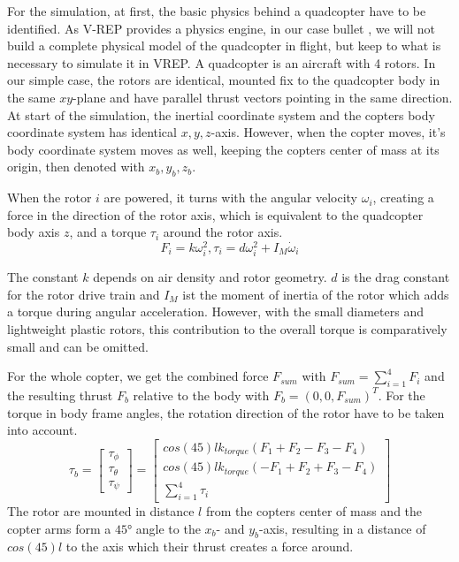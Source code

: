     
    For the simulation, at first, the basic physics behind a quadcopter have to be identified. 
    As V-REP provides a physics engine, in our case bullet \cite{bullet}, we will not build a complete physical model of the quadcopter in flight, but keep to what is necessary to simulate it in VREP.
    A quadcopter is an aircraft with 4 rotors. 
    In our simple case, the rotors are identical, mounted fix to the quadcopter body in the same $xy$-plane and have parallel thrust vectors pointing in the same direction. 
    At start of the simulation, the inertial coordinate system and the copters body coordinate system has identical $x,y,z$-axis. 
    However, when the copter moves, it's body coordinate system moves as well, keeping the copters center of mass at its origin, then denoted with $x_b, y_b, z_b$.
    
    When the rotor $i$ are powered, it turns with the angular velocity $\omega_i$, creating a force in the direction of the rotor axis, which is equivalent to the quadcopter body axis $z$, and a torque $\tau_i$ around the rotor axis.
    \begin{equation}
    F_i = k\omega_i^2, \tau_i = d\omega_i^2 + I_M\dot\omega_i
    \label{equ:forceAndTorque}
    \end{equation}
    
    The constant $k$ depends on air density and rotor geometry. $d$ is the drag constant for the rotor drive train and $I_M$ ist the moment of inertia of the rotor which adds a torque during angular acceleration. However, with the small diameters and lightweight plastic rotors, this contribution to the overall torque is comparatively small and can be omitted.
    
    For the whole copter, we get the combined force $F_{sum}$ with $F_{sum} = \sum_{i=1}^{4}{F_i}$ and the resulting thrust $F_b$ relative to the body with $F_b = (0, 0, F_{sum})^T$. For the torque in body frame angles, the rotation direction of the rotor have to be taken into account.
    \begin{equation}
    \tau_b =\begin{bmatrix}\tau_\phi \\ \tau_\theta \\ \tau_\psi \end{bmatrix} = \begin{bmatrix}cos(45)lk_{torque}(F_1 + F_2 - F_3 - F_4) \\ cos(45)lk_{torque}(-F_1 + F_2 + F_3  - F_4  ) \\ \sum_{i=1}^{4}{\tau_i} \end{bmatrix}
    \label{equ:torques}
    \end{equation}
    The rotor are mounted in distance $l$ from the copters center of mass and the copter arms form a $\ang{45}$ angle to the $x_b$- and $y_b$-axis, resulting in a distance of $cos(45)l$ to the axis which their thrust creates a force around\cite{luukkonen2011modelling}.
    
